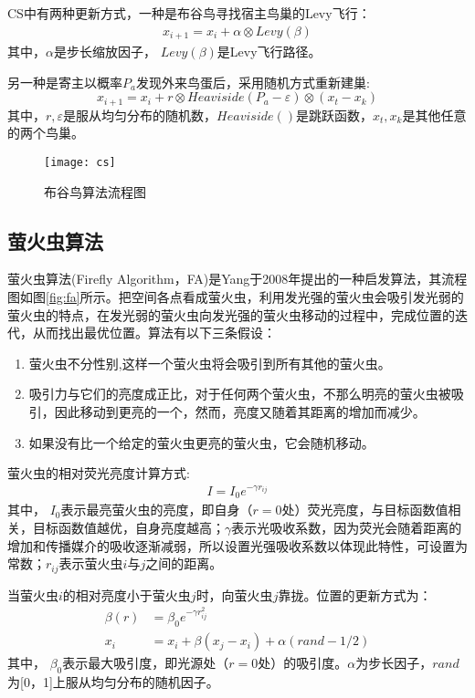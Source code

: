     CS中有两种更新方式，一种是布谷鸟寻找宿主鸟巢的Levy飞行：
    \begin{align}
      x_{i+1}=x_i+\alpha\otimes Levy(\beta)
    \end{align}
    其中，$\alpha$是步长缩放因子， $Levy(\beta)$是Levy飞行路径。

    另一种是寄主以概率$P_a$发现外来鸟蛋后，采用随机方式重新建巢:
    \begin{equation}
      x_{i+1}=x_i+r\otimes Heaviside(P_a-\varepsilon)\otimes(x_t-x_k)
    \end{equation}
    其中，$r,\varepsilon$是服从均匀分布的随机数，$Heaviside()$是跳跃函数，$x_t,x_k$是其他任意的两个鸟巢。
    \begin{figure}[htbp]
      \centering
      \texttt{[image: cs]}
      \caption{布谷鸟算法流程图}
      \label{fig:cs}
    \end{figure}

  \subsection{萤火虫算法}
  萤火虫算法(Firefly Algorithm，FA)是Yang于2008年提出的一种启发算法，其流程图如图\ref{fig:fa}所示。把空间各点看成萤火虫，利用发光强的萤火虫会吸引发光弱的萤火虫的特点，在发光弱的萤火虫向发光强的萤火虫移动的过程中，完成位置的迭代，从而找出最优位置。算法有以下三条假设：
  \begin{enumerate}
    \item {萤火虫不分性别,这样一个萤火虫将会吸引到所有其他的萤火虫。}
    \item {吸引力与它们的亮度成正比，对于任何两个萤火虫，不那么明亮的萤火虫被吸引，因此移动到更亮的一个，然而，亮度又随着其距离的增加而减少。}
    \item {如果没有比一个给定的萤火虫更亮的萤火虫，它会随机移动。}
  \end{enumerate}
  萤火虫的相对荧光亮度计算方式:
  \begin{align}
    I=I_0e^{-\gamma r_{ij}}
  \end{align}
  其中， $I_0$表示最亮萤火虫的亮度，即自身（$r=0$处）荧光亮度，与目标函数值相关，目标函数值越优，自身亮度越高；$\gamma$表示光吸收系数，因为荧光会随着距离的增加和传播媒介的吸收逐渐减弱，所以设置光强吸收系数以体现此特性，可设置为常数；$r_{ij}$表示萤火虫$i$与$j$之间的距离。 

  当萤火虫$i$的相对亮度小于萤火虫$j$时，向萤火虫$j$靠拢。位置的更新方式为：
  \begin{align}
    \beta(r)&=\beta_0e^{-\gamma r_{ij}^2} \\
    x_i&=x_i+\beta(x_j-x_i)+\alpha(rand-1/2)
  \end{align}
  其中， $\beta_0$表示最大吸引度，即光源处（$r=0$处）的吸引度。$\alpha$为步长因子，$rand$为[0，1]上服从均匀分布的随机因子。

